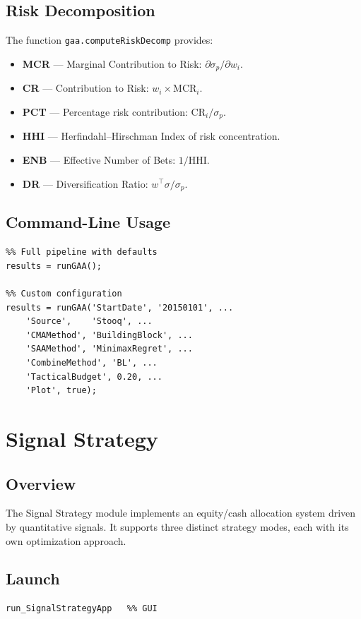 \documentclass[11pt,a4paper]{article}
\begin{document}
\subsection{Risk Decomposition}
The function \texttt{gaa.computeRiskDecomp} provides:
\begin{itemize}[leftmargin=2em]
  \item \textbf{MCR} --- Marginal Contribution to Risk: $\partial\sigma_p / \partial w_i$.
  \item \textbf{CR} --- Contribution to Risk: $w_i \times \text{MCR}_i$.
  \item \textbf{PCT} --- Percentage risk contribution: $\text{CR}_i / \sigma_p$.
  \item \textbf{HHI} --- Herfindahl--Hirschman Index of risk concentration.
  \item \textbf{ENB} --- Effective Number of Bets: $1/\text{HHI}$.
  \item \textbf{DR} --- Diversification Ratio: $w^\top\sigma / \sigma_p$.
\end{itemize}

\subsection{Command-Line Usage}
\begin{lstlisting}
%% Full pipeline with defaults
results = runGAA();

%% Custom configuration
results = runGAA('StartDate', '20150101', ...
    'Source',    'Stooq', ...
    'CMAMethod', 'BuildingBlock', ...
    'SAAMethod', 'MinimaxRegret', ...
    'CombineMethod', 'BL', ...
    'TacticalBudget', 0.20, ...
    'Plot', true);
\end{lstlisting}
\newpage
\section{Signal Strategy}

\subsection{Overview}
The Signal Strategy module implements an equity/cash allocation system driven by quantitative signals. It supports three distinct strategy modes, each with its own optimization approach.

\subsection{Launch}
\begin{lstlisting}
run_SignalStrategyApp   %% GUI
\end{lstlisting}
\end{document}
